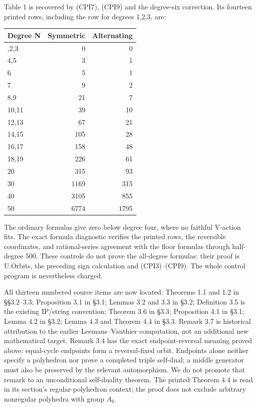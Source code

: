 \documentclass[
  11pt,
  a4paper,
]{article}
\newcounter{none} %
\begin{document}
Table 1 is recovered by (CPI7), (CPI9) and the degree-six correction.
Its fourteen printed rows, including the row for degrees 1,2,3, are:

{\def\LTcaptype{none} %
\begin{longtable}[]{@{}lrr@{}}
\toprule\noalign{}
Degree N & Symmetric & Alternating \\
\midrule\noalign{}
\endhead
\bottomrule\noalign{}
\endlastfoot
1,2,3 & 0 & 0 \\
4,5 & 3 & 1 \\
6 & 5 & 1 \\
7 & 9 & 2 \\
8,9 & 21 & 7 \\
10,11 & 39 & 10 \\
12,13 & 67 & 21 \\
14,15 & 105 & 28 \\
16,17 & 158 & 48 \\
18,19 & 226 & 61 \\
20 & 315 & 93 \\
30 & 1169 & 315 \\
40 & 3105 & 855 \\
50 & 6774 & 1795 \\
\end{longtable}
}

The ordinary formulas give zero below degree four, where no faithful
V-action fits. The exact formula diagnostic verifies the printed rows,
the reversible coordinates, and rational-series agreement with the floor
formulas through half-degree 500. These controls do not prove the
all-degree formulas: their proof is U.Orbits, the preceding sign
calculation and (CPI3)--(CPI9). The whole control program is
nevertheless charged.

All thirteen numbered source items are now located: Theorems 1.1 and 1.2
in §§3.2--3.3; Proposition 3.1 in §3.1; Lemmas 3.2 and 3.3 in §3.2;
Definition 3.5 is the existing IP/string convention; Theorem 3.6 in
§3.3; Proposition 4.1 in §3.1; Lemma 4.2 in §3.2; Lemma 4.3 and Theorem
4.4 in §3.3. Remark 3.7 is historical attribution to the earlier
Leemans--Vauthier computation, not an additional new mathematical
target. Remark 3.4 has the exact endpoint-reversal meaning proved above:
equal-cycle endpoints form a reversal-fixed orbit. Endpoints alone
neither specify a polyhedron nor prove a completed triple self-dual; a
middle generator must also be preserved by the relevant automorphism. We
do not promote that remark to an unconditional self-duality theorem. The
printed Theorem 4.4 is read in its section's regular-polyhedron context;
the proof does not exclude arbitrary nonregular polyhedra with group
\(A_6\).
\end{document}
